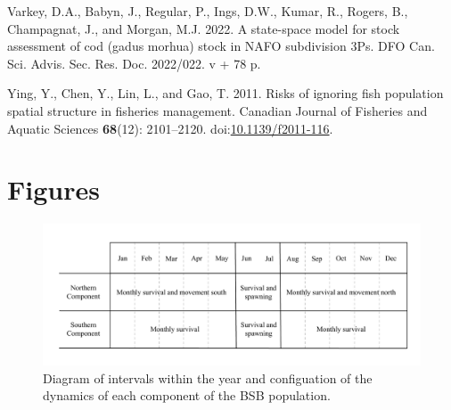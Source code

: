 \documentclass[
]{article}
\newlength{\cslhangindent}
\newlength{\cslentryspacingunit} %
\newenvironment{CSLReferences}[2] %
 {%
  \setlength{\parindent}{0pt}
  \ifodd #1
  \let\oldpar\par
  \def\par{\hangindent=\cslhangindent\oldpar}
  \fi
  \setlength{\parskip}{#2\cslentryspacingunit}
 }%
 {}
\begin{document}
\begin{CSLReferences}{1}{0}
\leavevmode{}%
Varkey, D.A., Babyn, J., Regular, P., Ings, D.W., Kumar, R., Rogers, B.,
Champagnat, J., and Morgan, M.J. 2022. A state-space model for stock
assessment of cod (gadus morhua) stock in NAFO subdivision 3Ps. {DFO}
{Can.} {Sci.} {Advis.} {Sec.} {Res.} {Doc.} 2022/022. v + 78 p.

\leavevmode{}%
Ying, Y., Chen, Y., Lin, L., and Gao, T. 2011. Risks of ignoring fish
population spatial structure in fisheries management. Canadian Journal
of Fisheries and Aquatic Sciences \textbf{68}(12): 2101--2120.
doi:\href{https://doi.org/10.1139/f2011-116}{10.1139/f2011-116}.

\end{CSLReferences}

\pagebreak

\pagebreak

\hypertarget{figures}{%
\section*{Figures}\label{figures}}

\begin{figure}

{\centering \includegraphics[width=0.8\linewidth]{bsb_movement_diagram} 

}

\caption{Diagram of intervals within the year and configuation of the dynamics of each component of the BSB population.}\label{fig:migration-diagram}
\end{figure}
\pagebreak
\end{document}
